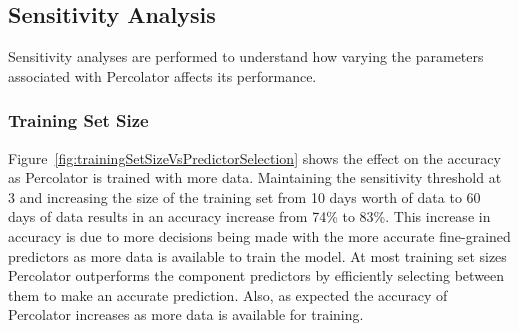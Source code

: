 \subsection{Sensitivity Analysis}
\label{sec:sensitivityAnalysis}
Sensitivity analyses are performed to understand how varying the parameters
associated with Percolator affects its performance.

\subsubsection{Training Set Size}

Figure~\ref{fig:trainingSetSizeVsPredictorSelection} shows the effect on the
accuracy as Percolator is trained with more data. Maintaining the sensitivity
threshold at 3 and increasing the size of the training set from 10 days worth of
data to 60 days of data results in an accuracy increase from 74\% to 83\%. This
increase in accuracy is due to more decisions being made with the more accurate
fine-grained predictors as more data is available to train the model. At most
training set sizes Percolator outperforms the component predictors by
efficiently selecting between them to make an accurate prediction. Also, as
expected the accuracy of Percolator increases as more data is available for
training.

